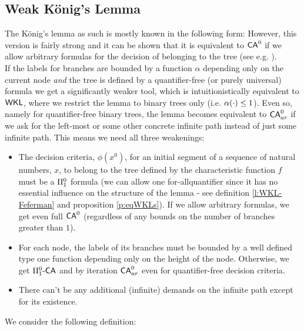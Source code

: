 %
\subsection {Weak K\"onig's Lemma}\label{s:wkl}
The K\"onig's lemma as such is mostly known in the following form:
However, this version is fairly strong and it can be shown 
that it is equivalent to $\textsf{\upshape CA}^0$ if we allow arbitrary formulas for the
decision of belonging to the tree (see e.g. \cite{Troelstra74}).\\
If the labels for branches are bounded
by a function $\alpha$ depending only on the current node {\em and}
the tree is defined by a quantifier-free (or purely universal) formula 
we get a significantly
weaker tool, which is intuitionistically equivalent to $\textsf{\upshape WKL}$, where 
we restrict the lemma to binary trees only (i.e. $\alpha(\cdot)\leq\nolinebreak 1$).
Even so, namely for quantifier-free binary trees, the lemma becomes
equivalent to $\textsf{\upshape CA}^0_{ar}$ if we ask for the left-most or some other concrete
infinite path instead of just some infinite path. This means we need
all three weakenings:
\begin{itemize}
\item The decision criteria, $\phi(x^0)$, for an initial segment
of a sequence of natural numbers, $x$,
 to belong to the tree defined by the characteristic function $f$ must be
a $\Pi^0_1$ formula (we can allow one for-all\nbd quantifier since it has no 
essential influence on the structure of the lemma - see definition
\ref{l:WKL-Feferman} and proposition \ref{p:eqWKLs}). If we allow 
arbitrary formulas, we get even full %
$\textsf{\upshape CA}^0$ (regardless of any bounds on the number of branches greater than $1$).
\item For each node, the labels of its branches must be bounded by a well defined type one
function depending only on the height of the node. Otherwise, we get $\Pi^0_1\textsf{\upshape -}\textsf{\upshape CA}$ and
by iteration $\textsf{\upshape CA}^0_{ar}$ even for quantifier-free decision criteria.
\item There can't be any additional (infinite) demands on the infinite path except for its
existence. 
\end{itemize}
  We consider the following definition:
%
%
